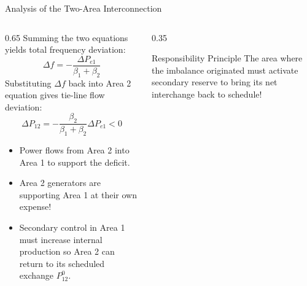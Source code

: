 \begin{frame}{Analysis of the Two-Area Interconnection}
\begin{columns}[T]
\begin{column}{0.65\textwidth}
    \footnotesize
    Summing the two equations yields total frequency deviation:
    \begin{equation*}
        \Delta f = - \frac{\Delta P_{e1}}{\beta_1 + \beta_2}
    \end{equation*}
    Substituting $\Delta f$ back into Area 2 equation gives tie-line flow deviation:
    \begin{equation*}
        \Delta P_{12} = - \frac{\beta_2}{\beta_1 + \beta_2} \Delta P_{e1} < 0
    \end{equation*}
    \begin{itemize}\setlength{\itemsep}{1pt}
        \item Power flows from Area 2 into Area 1 to support the deficit.
        \item Area 2 generators are supporting Area 1 at their own expense!
        \item Secondary control in Area 1 must increase internal production so Area 2 can return to its scheduled exchange $P_{12}^0$.
    \end{itemize}
\end{column}
\begin{column}{0.35\textwidth}
    \begin{block}{Responsibility Principle}
    \scriptsize
    The area where the imbalance originated must activate secondary reserve to bring its net interchange back to schedule!
    \end{block}
\end{column}
\end{columns}
\end{frame}

